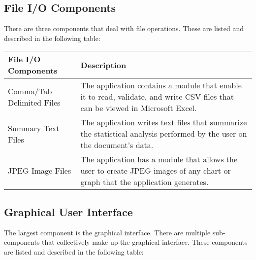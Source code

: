 \documentclass[12pt]{article}
\begin{document}
\subsection{File I/O Components}
There are three components that deal with file operations. These are listed and
described in the following table:

\begin{center}
\begin{tabularx}{\textwidth}{|X|p{8cm}|}
	\hline \textbf{File I/O Components} & \textbf{Description} \\
	\hline Comma/Tab Delimited Files & The application contains a module that
		enable it to read, validate, and write CSV files that can be viewed in
		Microsoft Excel. \\
	\hline Summary Text Files & The application writes text files that
		summarize the statistical analysis performed by the user on the
		document’s data. \\
	\hline JPEG Image Files & The application has a module that allows the user
		to create JPEG images of any chart or graph that the application
		generates. \\
	\hline
\end{tabularx}
\end{center}

\subsection{Graphical User Interface}
The largest component is the graphical interface. There are multiple
sub-components that collectively make up the graphical interface. These
components are listed and described in the following table:
\end{document}
